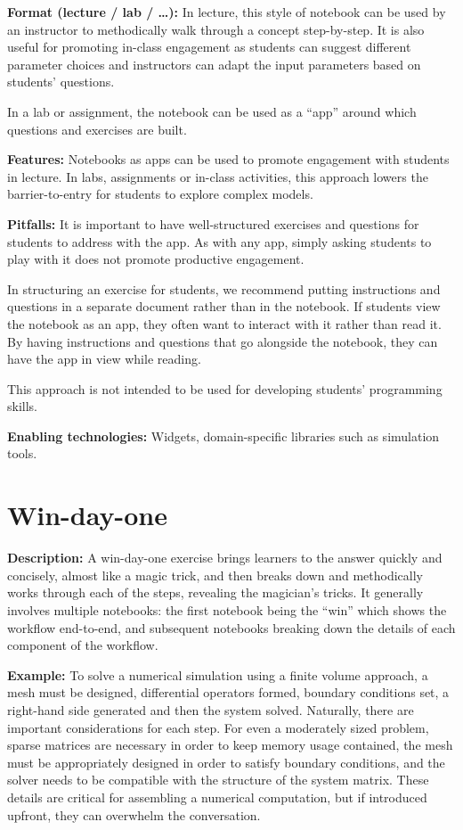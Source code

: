 \documentclass[]{book}
\begin{document}
\textbf{Format (lecture / lab / \ldots{}):} In lecture, this style of
notebook can be used by an instructor to methodically walk through a
concept step-by-step. It is also useful for promoting in-class
engagement as students can suggest different parameter choices and
instructors can adapt the input parameters based on students' questions.

In a lab or assignment, the notebook can be used as a ``app'' around
which questions and exercises are built.

\textbf{Features:} Notebooks as apps can be used to promote engagement
with students in lecture. In labs, assignments or in-class activities,
this approach lowers the barrier-to-entry for students to explore
complex models.

\textbf{Pitfalls:} It is important to have well-structured exercises and
questions for students to address with the app. As with any app, simply
asking students to play with it does not promote productive engagement.

In structuring an exercise for students, we recommend putting
instructions and questions in a separate document rather than in the
notebook. If students view the notebook as an app, they often want to
interact with it rather than read it. By having instructions and
questions that go alongside the notebook, they can have the app in view
while reading.

This approach is not intended to be used for developing students'
programming skills.

\textbf{Enabling technologies:} Widgets, domain-specific libraries such
as simulation tools.

\hypertarget{win-day-one}{\section{Win-day-one}\label{win-day-one}}

\textbf{Description:} A win-day-one exercise brings learners to the
answer quickly and concisely, almost like a magic trick, and then breaks
down and methodically works through each of the steps, revealing the
magician's tricks. It generally involves multiple notebooks: the first
notebook being the ``win'' which shows the workflow end-to-end, and
subsequent notebooks breaking down the details of each component of the
workflow.

\textbf{Example:} To solve a numerical simulation using a finite volume
approach, a mesh must be designed, differential operators formed,
boundary conditions set, a right-hand side generated and then the system
solved. Naturally, there are important considerations for each step. For
even a moderately sized problem, sparse matrices are necessary in order
to keep memory usage contained, the mesh must be appropriately designed
in order to satisfy boundary conditions, and the solver needs to be
compatible with the structure of the system matrix. These details are
critical for assembling a numerical computation, but if introduced
upfront, they can overwhelm the conversation.
\end{document}
